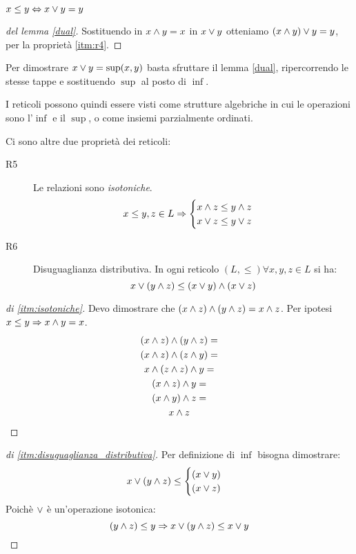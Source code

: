 \begin{lem}\label{dual}
$ x \le y \Leftrightarrow x \vee y = y $
\end{lem}
\begin{proof}[del lemma \ref{dual}]
Sostituendo in $x \wedge y = x$ in $ x \vee y $ otteniamo $ (x \wedge y) \vee y = y $, per la propriet\`a \ref{itm:r4}.
\end{proof}
Per dimostrare $x \vee y = \sup(x,y)$ basta sfruttare il lemma \ref{dual}, ripercorrendo le stesse tappe e sostituendo $\sup$ al posto di $\inf$.

I reticoli possono quindi essere visti come strutture algebriche in cui le operazioni sono l'$\inf$ e il $\sup$, o come insiemi parzialmente ordinati.

Ci sono altre due propriet\`a dei reticoli:
\begin{description}
  \item [R5\label{itm:isotoniche}] Le relazioni sono \textit{isotoniche}.
  \[
  x \le y, z \in L \Rightarrow 
  \begin{cases}
  x \wedge z \le y \wedge z \\ 
  x \vee z \le y \vee z
  \end{cases}
  \]
  \item [R6\label{itm:disuguaglianza_distributiva}] Disuguaglianza distributiva. In ogni reticolo $(L, \le) \forall x, y, z \in L $ si ha:
  \[
  x \vee (y \wedge z) \le (x \vee y) \wedge (x \vee z)
  \]
\end{description}

\begin{proof}[di \ref{itm:isotoniche}]
Devo dimostrare che $ (x \wedge z) \wedge (y \wedge z) = x \wedge z $.
Per ipotesi $x \le y \Rightarrow x \wedge y = x$.
\begin{multline*}
(x \wedge z) \wedge (y \wedge z) = \\
(x \wedge z) \wedge (z \wedge y) = \\
x \wedge (z \wedge z) \wedge y = \\
(x \wedge z) \wedge y = \\
(x \wedge y) \wedge z = \\
 x \wedge z
\end{multline*}
\end{proof}
\begin{proof}[di \ref{itm:disuguaglianza_distributiva}]
Per definizione di $\inf$ bisogna dimostrare:
\[
x \vee (y \wedge z) \le 
\begin{cases}
(x \vee y) \\
(x \vee z)
\end{cases}
\]
Poich\`e $\vee$ \`e un'operazione isotonica:
\[
(y \wedge z) \le y \Rightarrow x \vee (y \wedge z) \le x \vee y
\]
\end{proof}


